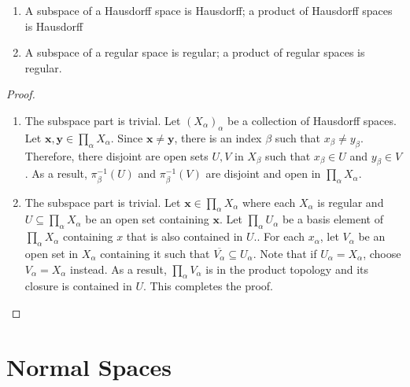 \begin{theorem}
    \hfill 
    \begin{enumerate}
        \item A subspace of a Hausdorff space is Hausdorff; a product of Hausdorff spaces is Hausdorff 
        \item A subspace of a regular space is regular; a product of regular spaces is regular.
    \end{enumerate}
\end{theorem}
\begin{proof}
    \hfill 
    \begin{enumerate}
        \item The subspace part is trivial. Let $(X_\alpha)_\alpha$ be a collection of Hausdorff spaces. Let $\mathbf{x},\mathbf{y}\in\prod_\alpha X_\alpha$. Since $\mathbf{x}\ne\mathbf{y}$, there is an index $\beta$ such that $x_\beta\ne y_\beta$. Therefore, there disjoint are open sets $U,V$ in $X_\beta$ such that $x_\beta\in U$ and $y_\beta\in V$. As a result, $\pi_\beta^{-1}(U)$ and $\pi_\beta^{-1}(V)$ are disjoint and open in $\prod_\alpha X_\alpha$.

        \item The subspace part is trivial. Let $\mathbf{x}\in\prod_\alpha X_\alpha$ where each $X_\alpha$ is regular and $U\subseteq\prod_\alpha X_\alpha$ be an open set containing $\mathbf{x}$. Let $\prod_\alpha U_\alpha$ be a basis element of $\prod_\alpha X_\alpha$ containing $x$ that is also contained in $U$.. For each $x_\alpha$, let $V_\alpha$ be an open set in $X_\alpha$ containing it such that $\overline{V_\alpha}\subseteq U_\alpha$. Note that if $U_\alpha = X_\alpha$, choose $V_\alpha = X_\alpha$ instead. As a result, $\prod_\alpha V_\alpha$ is in the product topology and its closure is contained in $U$. This completes the proof.
    \end{enumerate}
\end{proof}

\section{Normal Spaces}

